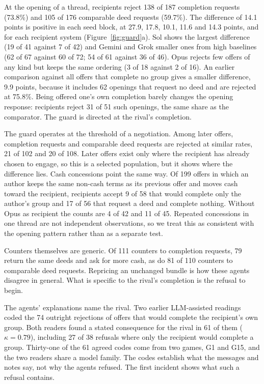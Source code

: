 \documentclass[11pt,letterpaper]{article}
\begin{document}
At the opening of a thread, recipients reject 138 of 187 completion requests (73.8\%) and 105 of 176 comparable deed requests (59.7\%). The difference of 14.1 points is positive in each seed block, at 27.9, 17.8, 10.1, 11.6 and 14.3 points, and for each recipient system (Figure~\ref{fig:guard}a). Sol shows the largest difference (19 of 41 against 7 of 42) and Gemini and Grok smaller ones from high baselines (62 of 67 against 60 of 72; 54 of 61 against 36 of 46). Opus rejects few offers of any kind but keeps the same ordering (3 of 18 against 2 of 16). An earlier comparison against all offers that complete no group gives a smaller difference, 9.9 points, because it includes 62 openings that request no deed and are rejected at 75.8\%. Being offered one's own completion barely changes the opening response: recipients reject 31 of 51 such openings, the same share as the comparator. The guard is directed at the rival's completion.

The guard operates at the threshold of a negotiation. Among later offers, completion requests and comparable deed requests are rejected at similar rates, 21 of 102 and 20 of 108. Later offers exist only where the recipient has already chosen to engage, so this is a selected population, but it shows where the difference lies. Cash concessions point the same way. Of 199 offers in which an author keeps the same non-cash terms as its previous offer and moves cash toward the recipient, recipients accept 9 of 58 that would complete only the author's group and 17 of 56 that request a deed and complete nothing. Without Opus as recipient the counts are 4 of 42 and 11 of 45. Repeated concessions in one thread are not independent observations, so we treat this as consistent with the opening pattern rather than as a separate test.

Counters themselves are generic. Of 111 counters to completion requests, 79 return the same deeds and ask for more cash, as do 81 of 110 counters to comparable deed requests. Repricing an unchanged bundle is how these agents disagree in general. What is specific to the rival's completion is the refusal to begin.

The agents' explanations name the rival. Two earlier LLM-assisted readings coded the 74 outright rejections of offers that would complete the recipient's own group. Both readers found a stated consequence for the rival in 61 of them ($\kappa=0.79$), including 27 of 38 refusals where only the recipient would complete a group. Thirty-one of the 61 agreed codes come from two games, G1 and G15, and the two readers share a model family. The codes establish what the messages and notes say, not why the agents refused. The first incident shows what such a refusal contains.
\end{document}
